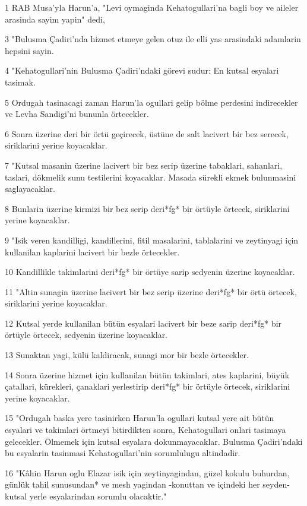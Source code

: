 \par 1 RAB Musa'yla Harun'a, "Levi oymaginda Kehatogullari'na bagli boy ve aileler arasinda sayim yapin" dedi,
\par 3 "Bulusma Çadiri'nda hizmet etmeye gelen otuz ile elli yas arasindaki adamlarin hepsini sayin.
\par 4 "Kehatogullari'nin Bulusma Çadiri'ndaki görevi sudur: En kutsal esyalari tasimak.
\par 5 Ordugah tasinacagi zaman Harun'la ogullari gelip bölme perdesini indirecekler ve Levha Sandigi'ni bununla örtecekler.
\par 6 Sonra üzerine deri bir örtü geçirecek, üstüne de salt lacivert bir bez serecek, siriklarini yerine koyacaklar.
\par 7 "Kutsal masanin üzerine lacivert bir bez serip üzerine tabaklari, sahanlari, taslari, dökmelik sunu testilerini koyacaklar. Masada sürekli ekmek bulunmasini saglayacaklar.
\par 8 Bunlarin üzerine kirmizi bir bez serip deri*fg* bir örtüyle örtecek, siriklarini yerine koyacaklar.
\par 9 "Isik veren kandilligi, kandillerini, fitil masalarini, tablalarini ve zeytinyagi için kullanilan kaplarini lacivert bir bezle örtecekler.
\par 10 Kandillikle takimlarini deri*fg* bir örtüye sarip sedyenin üzerine koyacaklar.
\par 11 "Altin sunagin üzerine lacivert bir bez serip üzerine deri*fg* bir örtü örtecek, siriklarini yerine koyacaklar.
\par 12 Kutsal yerde kullanilan bütün esyalari lacivert bir beze sarip deri*fg* bir örtüyle örtecek, sedyenin üzerine koyacaklar.
\par 13 Sunaktan yagi, külü kaldiracak, sunagi mor bir bezle örtecekler.
\par 14 Sonra üzerine hizmet için kullanilan bütün takimlari, ates kaplarini, büyük çatallari, kürekleri, çanaklari yerlestirip deri*fg* bir örtüyle örtecek, siriklarini yerine koyacaklar.
\par 15 "Ordugah baska yere tasinirken Harun'la ogullari kutsal yere ait bütün esyalari ve takimlari örtmeyi bitirdikten sonra, Kehatogullari onlari tasimaya gelecekler. Ölmemek için kutsal esyalara dokunmayacaklar. Bulusma Çadiri'ndaki bu esyalarin tasinmasi Kehatogullari'nin sorumlulugu altindadir.
\par 16 "Kâhin Harun oglu Elazar isik için zeytinyagindan, güzel kokulu buhurdan, günlük tahil sunusundan* ve mesh yagindan -konuttan ve içindeki her seyden- kutsal yerle esyalarindan sorumlu olacaktir."
